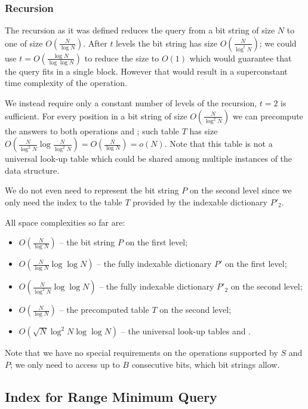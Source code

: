 \subsubsection{Recursion}

The recursion as it was defined reduces the query from a bit string of size $N$ to one of size $O(\frac{N}{\log N})$.
After $t$ levels the bit string has size $O\left(\frac{N}{\log^t N}\right)$; we could use $t = O\left(\frac{\log N}{\log\log N}\right)$ to reduce the size to $O(1)$ which would guarantee that the query fits in a single block.
However that would result in a superconstant time complexity of the operation.

We instead require only a constant number of levels of the recursion, $t = 2$ is sufficient.
For every position in a bit string of size $O\left(\frac{N}{\log^2 N}\right)$ we can precompute the answers to both operations \match{} and \enclose{}; such table $T$ has size $O\left(\frac{N}{\log^2 N} \log \frac{N}{\log^2 N}\right) = O\left(\frac{N}{\log N}\right) = o(N)$.
Note that this table is not a universal look-up table which could be shared among multiple instances of the data structure.

We do not even need to represent the bit string $P$ on the second level since we only need the index to the table $T$ provided by the indexable dictionary $P'_2$.

\bigskip

All space complexities so far are:
\begin{itemize}
	\item $O\left(\frac{N}{\log N}\right)$ -- the bit string $P$ on the first level;
	\item $O\left(\frac{N}{\log N}\log \log N\right)$ -- the fully indexable dictionary $P'$ on the first level;
	\item $O\left(\frac{N}{\log^2 N}\log \log N\right)$ -- the fully indexable dictionary $P'_2$ on the second level;
	\item $O\left(\frac{N}{\log N}\right)$ -- the precomputed table $T$ on the second level;
	\item $O\left(\sqrt{N}\log^2 N \log\log N\right)$ -- the universal look-up tables \fwdSearch{} and \bwdSearch{}.
\end{itemize}
Note that we have no special requirements on the operations supported by $S$ and $P$; we only need to access up to $B$ consecutive bits, which bit strings allow.

\subsection{Index for Range Minimum Query}

